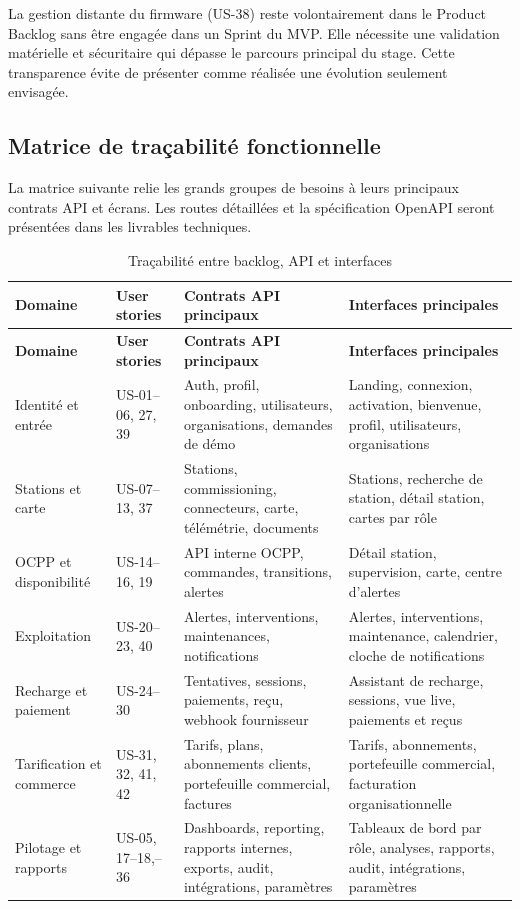 La gestion distante du firmware (US-38) reste volontairement dans le Product Backlog
sans être engagée dans un Sprint du MVP. Elle nécessite une validation matérielle et
sécuritaire qui dépasse le parcours principal du stage. Cette transparence évite de
présenter comme réalisée une évolution seulement envisagée.

\subsection{Matrice de traçabilité fonctionnelle}

La matrice suivante relie les grands groupes de besoins à leurs principaux contrats
API et écrans. Les routes détaillées et la spécification OpenAPI seront présentées
dans les livrables techniques.

\begingroup
\small
\setlength{\tabcolsep}{3pt}
\begin{longtable}{|p{2.9cm}|p{2.9cm}|p{4.2cm}|p{3.9cm}|}
  \caption{Traçabilité entre backlog, API et interfaces}
  \label{tab:functional-traceability}\\
  \hline
  \textbf{Domaine} & \textbf{User stories} & \textbf{Contrats API principaux} &
  \textbf{Interfaces principales}\\
  \hline
  \endfirsthead
  \hline
  \textbf{Domaine} & \textbf{User stories} & \textbf{Contrats API principaux} &
  \textbf{Interfaces principales}\\
  \hline
  \endhead
  Identité et entrée & US-01--06, 27, 39 &
  Auth, profil, onboarding, utilisateurs, organisations, demandes de démo &
  Landing, connexion, activation, bienvenue, profil, utilisateurs, organisations\\\hline
  Stations et carte & US-07--13, 37 &
  Stations, commissioning, connecteurs, carte, télémétrie, documents &
  Stations, recherche de station, détail station, cartes par rôle\\\hline
  OCPP et disponibilité & US-14--16, 19 &
  API interne OCPP, commandes, transitions, alertes &
  Détail station, supervision, carte, centre d'alertes\\\hline
  Exploitation & US-20--23, 40 &
  Alertes, interventions, maintenances, notifications &
  Alertes, interventions, maintenance, calendrier, cloche de notifications\\\hline
  Recharge et paiement & US-24--30 &
  Tentatives, sessions, paiements, reçu, webhook fournisseur &
  Assistant de recharge, sessions, vue live, paiements et reçus\\\hline
  Tarification et commerce & US-31, 32, 41, 42 &
  Tarifs, plans, abonnements clients, portefeuille commercial, factures &
  Tarifs, abonnements, portefeuille commercial, facturation organisationnelle\\\hline
  Pilotage et rapports & US-05, 17--18,\newline 33--36 &
  Dashboards, reporting, rapports internes, exports, audit, intégrations, paramètres &
  Tableaux de bord par rôle, analyses, rapports, audit, intégrations, paramètres\\
  \hline
\end{longtable}
\endgroup
